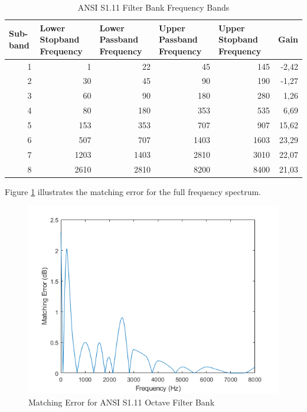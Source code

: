 \documentclass[11pt,onecolumn]{witseiepaper}
\begin{document}
\begin{appendices}
\begin{table}[htbp]
  \centering
  \caption{ANSI S1.11 Filter Bank Frequency Bands}
  \begin{adjustbox}{width=0.9\linewidth}
    \begin{tabular}{|r|r|r|r|r|r|}
    \hline
    \multicolumn{1}{|l|}{\textbf{Sub-band}} & \multicolumn{1}{l|}{\textbf{Lower Stopband Frequency}} & \multicolumn{1}{l|}{\textbf{Lower Passband Frequency}} & \multicolumn{1}{l|}{\textbf{Upper Passband Frequency}} & \multicolumn{1}{l|}{\textbf{Upper Stopband Frequency}} & \multicolumn{1}{l|}{\textbf{Gain}} \\
    \hline
    1     & 1     & 22    & 45    & 145   & -2,42 \\
    \hline
    2     & 30    & 45    & 90    & 190   & -1,27 \\
    \hline
    3     & 60    & 90    & 180   & 280   & 1,26 \\
    \hline
    4     & 80    & 180   & 353   & 535   & 6,69 \\
    \hline
    5     & 153   & 353   & 707   & 907   & 15,62 \\
    \hline
    6     & 507   & 707   & 1403  & 1603  & 23,29 \\
    \hline
    7     & 1203  & 1403  & 2810  & 3010  & 22,07 \\
    \hline
    8     & 2610  & 2810  & 8200  & 8400  & 21,03 \\
    \hline
    \end{tabular}%
    \end{adjustbox}
  \label{tab:ansiFreqSpec}%
\end{table}%

\noindent Figure \ref{fig:ansiOctMatErr} illustrates the matching error for the full frequency spectrum.

\begin{figure}[h]
\centering
\includegraphics[width=0.6\linewidth]{ansiOctMatErr.PNG}
\caption{Matching Error for ANSI S1.11 Octave Filter Bank}
\label{fig:ansiOctMatErr}
\end{figure} 



\end{appendices}
\end{document}
